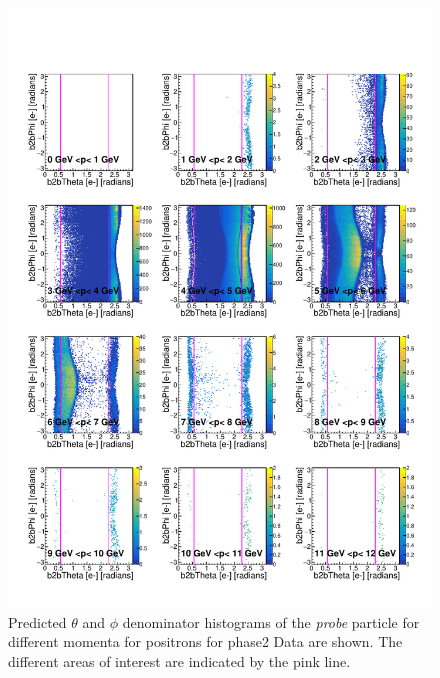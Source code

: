 \documentclass[a4paper,11pt,twosided,final,german,openbib,pdftex,listof=totoc,bibliography=totoc]{scrbook}
\begin{document}
\begin{appendix}
\begin{figure}[h!]
	\includegraphics[width=\textwidth]{Plots/RTPMepD_Data.pdf}
	\caption[Denominator $\theta$, $\phi$ Positron Momentum Data]{Predicted $\theta$ and $\phi$ denominator histograms of the \textit{probe} particle for different momenta for positrons for phase2 Data are shown. The different areas of interest are indicated by the pink line.}
	\label{plt:RTPMepD_Data}
\end{figure}







\end{appendix}
\end{document}
